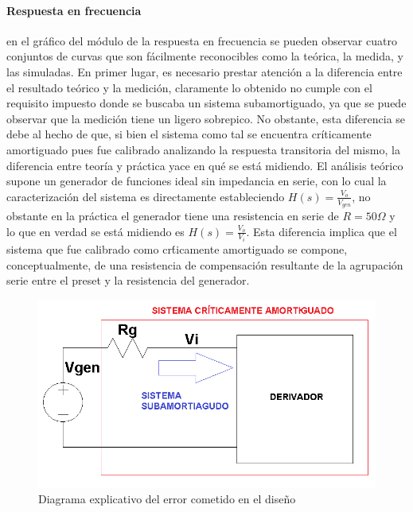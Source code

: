 \paragraph*{Respuesta en frecuencia} en el gr\'afico del m\'odulo de la respuesta en frecuencia se pueden observar cuatro conjuntos de curvas
que son f\'acilmente reconocibles como la te\'orica, la medida, y las simuladas. En primer lugar, es necesario prestar atenci\'on a la diferencia entre el resultado
te\'orico y la medici\'on, claramente lo obtenido no cumple con el requisito impuesto donde se buscaba un sistema subamortiguado, ya que se puede observar que la medici\'on 
tiene un ligero sobrepico. No obstante, esta diferencia se debe al hecho de que, si bien el sistema como tal se encuentra cr\'iticamente amortiguado pues fue calibrado analizando
la respuesta transitoria del mismo, la diferencia entre teor\'ia y pr\'actica yace en qu\'e se est\'a midiendo. El an\'alisis te\'orico supone un generador de funciones ideal
sin impedancia en serie, con lo cual la caracterizaci\'on del sistema es directamente estableciendo $H(s) = \frac{V_o}{V_{gen}}$, no obstante en la pr\'actica el generador tiene una resistencia
en serie de $R = 50 \Omega$ y lo que en verdad se est\'a midiendo es $H(s) = \frac{V_o}{V_i}$. Esta diferencia implica que el sistema que fue calibrado como cr\'ticamente amortiguado se compone, conceptualmente,
de una resistencia de compensaci\'on resultante de la agrupaci\'on serie entre el preset y la resistencia del generador.

\begin{figure}[H]
	\centering
	\includegraphics[scale=0.6]{../EJ4/Recursos/Integrador/correccion.png}
	\caption{Diagrama explicativo del error cometido en el dise\~no}
	\label{fig:derivador_correccion}
\end{figure}

